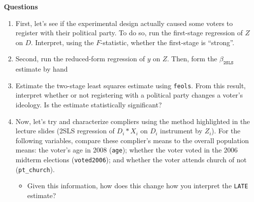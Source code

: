\documentclass[12pt]{article}
\begin{document}
\bigskip
\textbf{Questions}
\begin{enumerate}
  \item First, let's see if the experimental design actually caused some voters to register with their political party. To do so, run the first-stage regression of $Z$ on $D$. Interpret, using the $F$-statistic, whether the first-stage is ``strong''.
  
  \item Second, run the reduced-form regression of $y$ on $Z$. Then, form the $\beta_{\texttt{2SLS}}$ estimate by hand
  
  \item Estimate the two-stage least squares estimate using \texttt{feols}. From this result, interpret whether or not registering with a political party changes a voter's ideology. Is the estimate statistically significant? 
  
  \item Now, let's try and characterize compliers using the method highlighted in the lecture slides (2SLS regression of $D_i * X_i$ on $D_i$ instrument by $Z_i$). For the following variables, compare these complier's means to the overall population means: the voter's age in 2008 (\texttt{age}); whether the voter voted in the 2006 midterm elections (\texttt{voted2006}); and whether the voter attends church of not (\texttt{pt\_church}).
  \begin{itemize}
    \item Given this information, how does this change how you interpret the \texttt{LATE} estimate?
  \end{itemize}
\end{enumerate}
\end{document}
